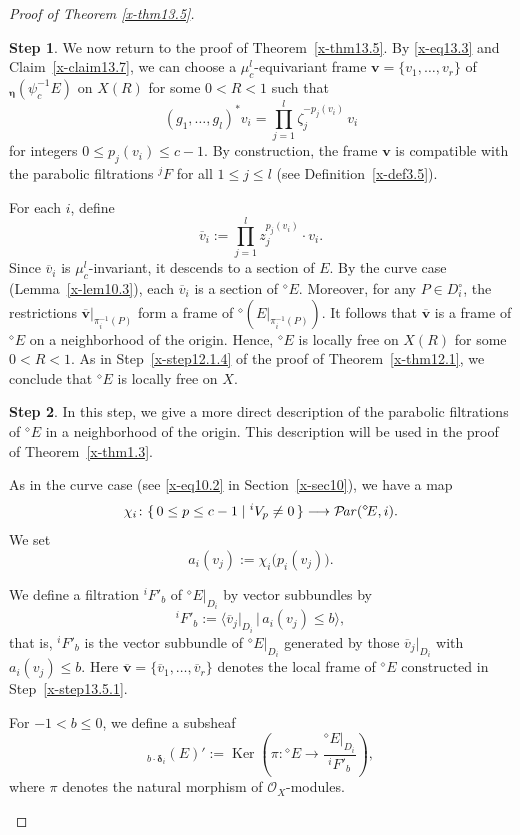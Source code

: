\documentclass[12pt,twoside]{amsart}
\DeclareMathOperator{\Ker}{Ker}
\DeclareMathOperator{\Par}{\mathcal{P}\!\it{ar}}
\theoremstyle{definition}
\newtheorem{step}{Step}
\begin{document}
\begin{proof}[Proof of Theorem \ref{x-thm13.5}]
\begin{step}
We now return to the proof of Theorem~\ref{x-thm13.5}.
By \eqref{x-eq13.3} and Claim~\ref{x-claim13.7}, we can choose a
$\mu_c^l$-equivariant frame
$\bm v=\{v_1,\ldots,v_r\}$ of
${}_{\bm \eta} (\psi_c^{-1} E)$
on $X(R)$ for some $0<R<1$ such that
\[
(g_1,\ldots,g_l)^* v_i
= \prod_{j=1}^l \zeta_j^{-p_j(v_i)}\, v_i
\]
for integers $0\le p_j(v_i)\le c-1$.
By construction, the frame $\bm v$ is compatible with the parabolic
filtrations ${}^j\!F$ for all $1\le j\le l$
(see Definition~\ref{x-def3.5}).

For each $i$, define
\[
\overline v_i := \prod_{j=1}^l z_j^{p_j(v_i)} \cdot v_i .
\]
Since $\overline v_i$ is $\mu_c^l$-invariant, it descends to a section of
$E$.
By the curve case (Lemma~\ref{x-lem10.3}), each $\overline v_i$ is a
section of ${}^\diamond\!E$.
Moreover, for any $P\in D_i^\circ$, the restrictions
$\overline{\bm v}|_{\pi_i^{-1}(P)}$ form a frame of
${}^\diamond\!(E|_{\pi_i^{-1}(P)})$.
It follows that $\overline{\bm v}$ is a frame of ${}^\diamond\!E$ on a
neighborhood of the origin.
Hence, ${}^\diamond\!E$ is locally free on $X(R)$ for some $0<R<1$.
As in Step~\ref{x-step12.1.4} of the proof of
Theorem~\ref{x-thm12.1}, we conclude that ${}^\diamond\!E$ is locally
free on $X$.
\end{step}

\begin{step}\label{x-step13.5.2}
In this step, we give a more direct description of the
parabolic filtrations of ${}^\diamond\!E$ in a neighborhood of the
origin.
This description will be used in the proof of
Theorem~\ref{x-thm1.3}.

As in the curve case (see \eqref{x-eq10.2} in
Section~\ref{x-sec10}), we have a map
\[
\chi_i \colon
\{\,0 \le p \le c-1 \mid {}^i V_p \neq 0\,\}
\longrightarrow
\Par({}^\diamond\!E, i).
\]
We set
\begin{equation}\label{x-eq13.4}
a_i(v_j) := \chi_i\bigl(p_i(v_j)\bigr).
\end{equation}

We define a filtration ${}^i\!F'_b$ of ${}^\diamond\!E|_{D_i}$ by vector
subbundles by
\[
{}^i\!F'_b :=
\bigl\langle \overline v_j|_{D_i} \,\big|\, a_i(v_j) \le b \bigr\rangle,
\]
that is, ${}^i\!F'_b$ is the vector subbundle of
${}^\diamond\!E|_{D_i}$ generated by those
$\overline v_j|_{D_i}$ with $a_i(v_j)\le b$.
Here
$\overline{\bm v}=\{\overline v_1,\ldots,\overline v_r\}$
denotes the local frame of ${}^\diamond\!E$ constructed in
Step~\ref{x-step13.5.1}.

For $-1<b\le 0$, we define a subsheaf
\[
{}_{b\cdot \bm \delta_i}(E)' :=
\Ker\!\left(
\pi \colon
{}^\diamond\!E \longrightarrow
\frac{{}^\diamond\!E|_{D_i}}{{}^i\!F'_b}
\right),
\]
where $\pi$ denotes the natural morphism of $\mathcal O_X$-modules.


\end{step}
\end{proof}
\end{document}
